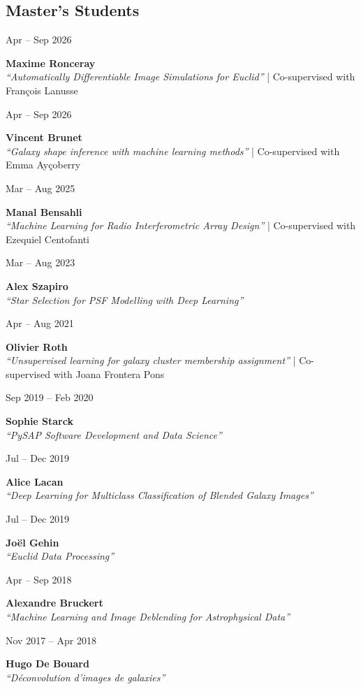 \documentclass[a4paper,10pt]{article}
\newlength{\cvdatew}
\newcommand{\cvline}[2]{%
  \vspace{2pt}%
  \noindent\begin{minipage}[t]{\cvdatew}%
    \raggedright\small\color{muted}#1%
  \end{minipage}%
  \hspace{0.6em}%
  \begin{minipage}[t]{\dimexpr\linewidth-\cvdatew-0.6em\relax}%
    #2%
  \end{minipage}%
  \vspace{2pt}%
}
\begin{document}
\subsection{Master's Students}

\cvline{Apr -- Sep 2026}{\textbf{Maxime Ronceray}\\
  {\small\color{muted}\textit{``Automatically Differentiable Image Simulations for Euclid''} | Co-supervised with Fran\c{c}ois Lanusse}}

\cvline{Apr -- Sep 2026}{\textbf{Vincent Brunet}\\
  {\small\color{muted}\textit{``Galaxy shape inference with machine learning methods''} | Co-supervised with Emma Ay\c{c}oberry}}

\cvline{Mar -- Aug 2025}{\textbf{Manal Bensahli}\\
  {\small\color{muted}\textit{``Machine Learning for Radio Interferometric Array Design''} | Co-supervised with Ezequiel Centofanti}}

\cvline{Mar -- Aug 2023}{\textbf{Alex Szapiro}\\
  {\small\color{muted}\textit{``Star Selection for PSF Modelling with Deep Learning''}}}

\cvline{Apr -- Aug 2021}{\textbf{Olivier Roth}\\
  {\small\color{muted}\textit{``Unsupervised learning for galaxy cluster membership assignment''} | Co-supervised with Joana Frontera Pons}}

\cvline{Sep 2019 -- Feb 2020}{\textbf{Sophie Starck}\\
  {\small\color{muted}\textit{``PySAP Software Development and Data Science''}}}

\cvline{Jul -- Dec 2019}{\textbf{Alice Lacan}\\
  {\small\color{muted}\textit{``Deep Learning for Multiclass Classification of Blended Galaxy Images''}}}

\cvline{Jul -- Dec 2019}{\textbf{Jo\"el Gehin}\\
  {\small\color{muted}\textit{``Euclid Data Processing''}}}

\cvline{Apr -- Sep 2018}{\textbf{Alexandre Bruckert}\\
  {\small\color{muted}\textit{``Machine Learning and Image Deblending for Astrophysical Data''}}}

\cvline{Nov 2017 -- Apr 2018}{\textbf{Hugo De Bouard}\\
  {\small\color{muted}\textit{``D\'econvolution d'images de galaxies''}}}
\end{document}
